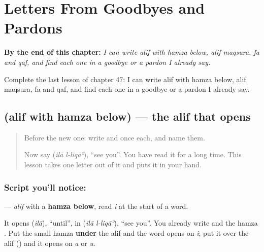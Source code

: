 
\chapter{Letters From Goodbyes and Pardons}
\label{ch:ar-letters-from-goodbyes}

\begin{chapteropening}
\textbf{By the end of this chapter:} \emph{I can write alif with hamza below, alif maqsura, fa and qaf, and find each one in a goodbye or a pardon I already say.}

Complete the last lesson of chapter 47: I can write alif with hamza below, alif maqsura, fa and qaf, and find each one in a goodbye or a pardon I already say.
\end{chapteropening}

\section[\texorpdfstring{\ar{إ} (alif with hamza below)}{إ (alif with hamza below)}]{ (alif with hamza below) — the alif that opens }

\label{lesson:AR-W47-alif-hamza-below}



\begin{quote}
Before the new one: write  and  once each, and name them.

Now say \textbf{ } (\emph{ilā l-liqāʾ}), \textquotedblleft{}see you\textquotedblright{}. You have read it for a long time. This lesson takes one letter out of it and puts it in your hand.
\end{quote}

\subsection*{Script you'll notice: }
\textbf{} — \emph{alif} with a \textbf{hamza below}, read \emph{i} at the start of a word.

It opens \textbf{} (\emph{ilā}), \textquotedblleft{}until\textquotedblright{}, in \textbf{ } (\emph{ilā l-liqāʾ}), \textquotedblleft{}see you\textquotedblright{}. You already write \textbf{} and the hamza \textbf{}. Put the small hamza \textbf{under} the alif and the word opens on \emph{i}; put it over the alif (\textbf{}) and it opens on \emph{a} or \emph{u}.

